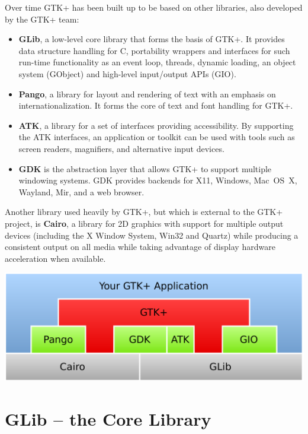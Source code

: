 \documentclass[a4paper,notumble]{leaflet}
\begin{document}
Over time GTK+ has been built up to be based on other libraries, also developed by the GTK+ team:
\begin{itemize}
  \item \textbf{GLib}, a low-level core library that forms the basis of GTK+. It provides data structure handling for C, portability wrappers and interfaces for such run-time functionality as an event loop, threads, dynamic loading, an object system (GObject) and high-level input/output APIs (GIO).

  \item \textbf{Pango}, a library for layout and rendering of text with an emphasis on internationalization. It forms the core of text and font handling for GTK+.

  \item \textbf{ATK}, a library for a set of interfaces providing accessibility. By supporting the ATK interfaces, an application or toolkit can be used with tools such as screen readers, magnifiers, and alternative input devices.

  \item \textbf{GDK} is the abstraction layer that allows GTK+ to support multiple windowing systems. GDK provides backends for X11, Windows, Mac~OS~X, Wayland, Mir, and a web browser.
\end{itemize}

\medskip
Another library used heavily by GTK+, but which is external to the GTK+ project, is \textbf{Cairo}, a library for 2D graphics with support for multiple output devices (including the X Window System, Win32 and Quartz) while producing a consistent output on all media while taking advantage of display hardware acceleration when available.

\vspace{0.8cm}
\includegraphics[width=\textwidth]{images/architecture.pdf}

\pagebreak
\section{GLib -- the Core Library}
\end{document}
